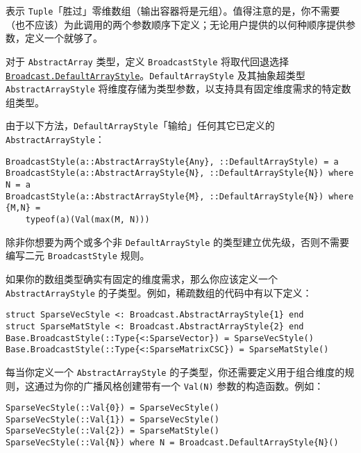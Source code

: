 表示 \texttt{Tuple}「胜过」零维数组（输出容器将是元组）。值得注意的是，你不需要（也不应该）为此调用的两个参数顺序下定义；无论用户提供的以何种顺序提供参数，定义一个就够了。



对于 \texttt{AbstractArray} 类型，定义 \texttt{BroadcastStyle} 将取代回退选择 \hyperlink{5203521679854231580}{\texttt{Broadcast.DefaultArrayStyle}}。\texttt{DefaultArrayStyle} 及其抽象超类型 \texttt{AbstractArrayStyle} 将维度存储为类型参数，以支持具有固定维度需求的特定数组类型。



由于以下方法，\texttt{DefaultArrayStyle}「输给」任何其它已定义的 \texttt{AbstractArrayStyle}：




\begin{verbatim}
BroadcastStyle(a::AbstractArrayStyle{Any}, ::DefaultArrayStyle) = a
BroadcastStyle(a::AbstractArrayStyle{N}, ::DefaultArrayStyle{N}) where N = a
BroadcastStyle(a::AbstractArrayStyle{M}, ::DefaultArrayStyle{N}) where {M,N} =
    typeof(a)(Val(max(M, N)))
\end{verbatim}



除非你想要为两个或多个非 \texttt{DefaultArrayStyle} 的类型建立优先级，否则不需要编写二元 \texttt{BroadcastStyle} 规则。



如果你的数组类型确实有固定的维度需求，那么你应该定义一个 \texttt{AbstractArrayStyle} 的子类型。例如，稀疏数组的代码中有以下定义：




\begin{verbatim}
struct SparseVecStyle <: Broadcast.AbstractArrayStyle{1} end
struct SparseMatStyle <: Broadcast.AbstractArrayStyle{2} end
Base.BroadcastStyle(::Type{<:SparseVector}) = SparseVecStyle()
Base.BroadcastStyle(::Type{<:SparseMatrixCSC}) = SparseMatStyle()
\end{verbatim}



每当你定义一个 \texttt{AbstractArrayStyle} 的子类型，你还需要定义用于组合维度的规则，这通过为你的广播风格创建带有一个 \texttt{Val(N)} 参数的构造函数。例如：




\begin{verbatim}
SparseVecStyle(::Val{0}) = SparseVecStyle()
SparseVecStyle(::Val{1}) = SparseVecStyle()
SparseVecStyle(::Val{2}) = SparseMatStyle()
SparseVecStyle(::Val{N}) where N = Broadcast.DefaultArrayStyle{N}()
\end{verbatim}



